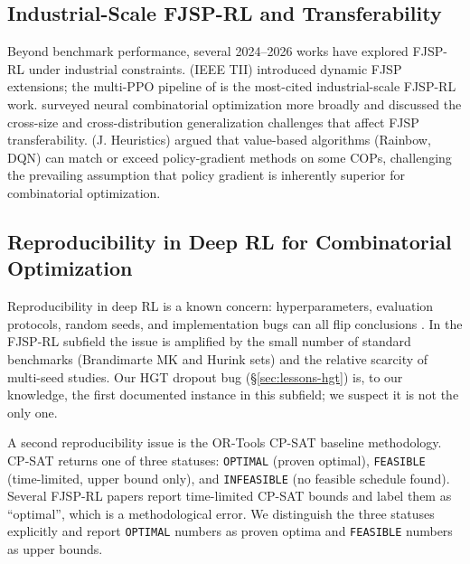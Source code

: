 \documentclass[10pt]{article}
\theoremstyle{definition}
\begin{document}
\subsection{Industrial-Scale FJSP-RL and Transferability}
\label{sec:rw-industrial}

Beyond benchmark performance, several 2024--2026
works have explored FJSP-RL under industrial
constraints. \citet{Lei2022} (IEEE TII) introduced
dynamic FJSP extensions; the multi-PPO pipeline of
\citet{Lei2022} is the most-cited industrial-scale
FJSP-RL work. \citet{Bengio2021Survey} surveyed
neural combinatorial optimization more broadly and
discussed the cross-size and cross-distribution
generalization challenges that affect FJSP
transferability. \citet{Mazyavkina2021RLCO} (J.
Heuristics) argued that value-based algorithms
(Rainbow, DQN) can match or exceed policy-gradient
methods on some COPs, challenging the prevailing
assumption that policy gradient is inherently
superior for combinatorial optimization.

\subsection{Reproducibility in Deep RL for Combinatorial Optimization}
\label{sec:rw-repro}

Reproducibility in deep RL is a known concern: hyperparameters,
evaluation protocols, random seeds, and implementation bugs can
all flip conclusions \citep{Islam2017, Henderson2018}. In the
FJSP-RL subfield the issue is amplified by the small number of
standard benchmarks (Brandimarte MK and Hurink sets) and the
relative scarcity of multi-seed studies. Our HGT dropout bug
(\S\ref{sec:lessons-hgt}) is, to our knowledge, the first documented
instance in this subfield; we suspect it is not the only one.

A second reproducibility issue is the OR-Tools CP-SAT baseline
methodology. CP-SAT returns one of three statuses:
\texttt{OPTIMAL} (proven optimal), \texttt{FEASIBLE} (time-limited,
upper bound only), and \texttt{INFEASIBLE} (no feasible schedule
found). Several FJSP-RL papers report time-limited CP-SAT bounds
and label them as ``optimal'', which is a methodological error.
We distinguish the three statuses explicitly and report
\texttt{OPTIMAL} numbers as proven optima and \texttt{FEASIBLE}
numbers as upper bounds.
\end{document}
